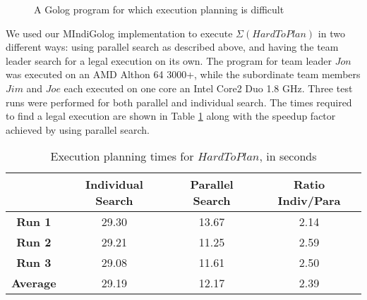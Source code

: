 %
\begin{figure}[!t]
\begin{centering}
\framebox{%
\parbox[t][1\totalheight]{0.85\columnwidth}{%
\begin{gather*}
\mathbf{proc}\, HardToPlan()\\
\left[AcquireType(Joe,Carrot)\,;\right.\\
AcquireType(Jon,Sugar)\,;\\
AcquireType(Jim,Lettuce)\,;\\
AcquireType(Joe,Flour)\,;\\
AcquireType(Jon,Flour)\,;\\
HasObject(Jon,Carrot3)?\,;\\
HasObject(Joe,Flour5)?\,;\\
\left.\, HasObject(Jon,Sugar4)?\right]\,\,\mathbf{end}\\
\\\mathbf{proc}\, AcquireType(Agt,Type)\\
\pi(obj,\, IsType(obj,Type)?\,;\\
\left.\, acquire(Agt,obj)))\right]\,\,\mathbf{end}\end{gather*}
}} 
\par\end{centering}

\caption{A Golog program for which execution planning is difficult\label{fig:MIndiGolog:HardToPlan}}

\end{figure}


We used our MIndiGolog implementation to execute $\Sigma(HardToPlan)$
in two different ways: using parallel search as described above, and
having the team leader search for a legal execution on its own. The
program for team leader $Jon$ was executed on an AMD Althon 64 3000+,
while the subordinate team members $Jim$ and $Joe$ each executed
on one core an Intel Core2 Duo 1.8 GHz. Three test runs were performed
for both parallel and individual search. The times required to find
a legal execution are shown in Table \ref{tab:MIndiGolog:Execution-planning-times}
along with the speedup factor achieved by using parallel search.

%
\begin{table}[!t]
\begin{centering}
\begin{tabular}{|c|c|c|c|}
\hline 
 & \textbf{Individual Search}  & \textbf{Parallel Search}  & \textbf{Ratio Indiv/Para}\tabularnewline
\hline
\hline 
\textbf{Run 1}  & 29.30  & 13.67  & 2.14\tabularnewline
\hline 
\textbf{Run 2}  & 29.21  & 11.25  & 2.59\tabularnewline
\hline 
\textbf{Run 3}  & 29.08  & 11.61  & 2.50\tabularnewline
\hline
\hline 
\textbf{Average}  & 29.19  & 12.17  & 2.39\tabularnewline
\hline
\end{tabular}
\par\end{centering}

\caption{Execution planning times for $HardToPlan$, in seconds\label{tab:MIndiGolog:Execution-planning-times}}

\end{table}



